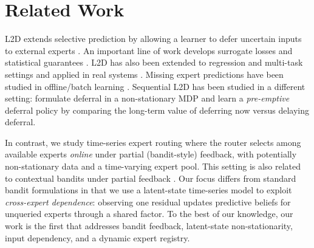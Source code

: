 \section{Related Work}
L2D extends selective prediction \citep{Chow_1970, Bartlett_Wegkamp_2008, cortes, Geifman_El-Yaniv_2017, cao2022generalizing, cortes2024cardinalityaware}
by allowing a learner to defer uncertain inputs to external experts \citep{madras2018predict, mozannar2021consistent, Verma2022LearningTD}.
An important line of work develops surrogate losses and statistical guarantees  \citep{mozannar2021consistent, Verma2022LearningTD,
    Cao_Mozannar_Feng_Wei_An_2023, Mozannar2023WhoSP, mao2024realizablehconsistentbayesconsistentloss,
    mao2025realizablehconsistentbayesconsistentloss, charusaie2022sample,
    mao2024principledapproacheslearningdefer, wei2024exploiting}.
L2D has also been extended to regression and multi-task settings and applied in real systems
\citep{mao2024regressionmultiexpertdeferral,
    strong2024towards, palomba2025a, montreuil2024twostagelearningtodefermultitasklearning, montreuil2025optimalqueryallocationextractive}.
Missing expert predictions have been studied in offline/batch learning \citep{nguyen2025probabilistic}.
Sequential L2D has been studied in a different setting: \citet{joshi2021learning} formulate deferral in a non-stationary MDP and learn a \emph{pre-emptive} deferral policy by comparing the long-term value of deferring now versus delaying deferral.

In contrast, we study time-series expert routing where the router selects among available experts \emph{online} under partial (bandit-style) feedback,
with potentially non-stationary data and a time-varying expert pool.
This setting is also related to contextual bandits under partial feedback \citep{li2010contextual, neu2010online}.
Our focus differs from standard bandit formulations in that we use a latent-state time-series model to exploit \emph{cross-expert dependence}:
observing one residual updates predictive beliefs for unqueried experts through a shared factor. To the best of our knowledge, our work is the first that addresses bandit feedback, latent-state non-stationarity, input dependency, and a dynamic expert registry.


